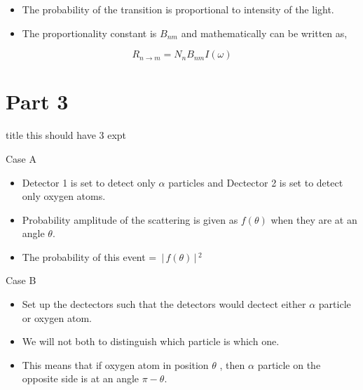 \documentclass[aspectratio=169]{beamer}
\begin{document}
\begin{frame}

	\begin{itemize}

		\item The probability of the transition is proportional to intensity of the light. \newline
		\item The proportionality constant is $B_{nm}$ and mathematically can be written as,
	\end{itemize}
		
			\begin{equation}
					 R_{n \to m} = N_{n} B_{nm} I(\omega) 
			\end{equation} 
						
\end{frame}

\section{Part 3}

\begin{frame}{title}
this should have 3 expt
\end{frame}


\begin{frame}{Case A}
	\begin{itemize}
		\item Detector 1 is set to detect only $ \alpha $ particles and Dectector 2 is set to detect only oxygen atoms.\newline
		\item Probability amplitude of the scattering is given as $ f(\theta)$ when they are at an angle $\theta$.\newline
		\item The probability of this event = $ \,\Bigr\rvert\,f(\theta) \,\Bigr\rvert\,^{2} $
	\end{itemize}		
\end{frame}


\begin{frame}{Case B}
	\begin{itemize}
		\item Set up the dectectors such that the detectors would dectect either $\alpha$ particle or oxygen atom.\newline
		\item We will not both to distinguish which particle is which one.\newline
		\item This means that if oxygen atom in position $\theta$ , then
		$\alpha$ particle on the opposite side is at an angle $\pi-\theta$.
	\end{itemize}
\end{frame}
\end{document}
